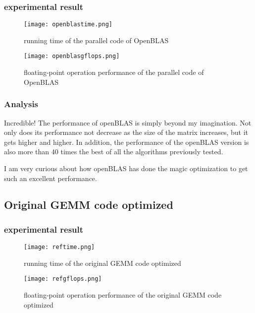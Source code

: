 \documentclass[11pt]{scrartcl} %
\begin{document}
	\subsubsection{experimental result}
		\begin{figure}[H]
			\centering
			\texttt{[image: openblastime.png]}
			\caption{running time of the parallel code of OpenBLAS}
			\label{}
		\end{figure}
		\begin{figure}[H]
			\centering
			\texttt{[image: openblasgflops.png]}
			\caption{floating-point operation performance of the parallel code of OpenBLAS}
			\label{}
		\end{figure}
		\subsubsection{Analysis}
		Incredible! The performance of openBLAS is simply beyond my imagination. Not only does its performance not decrease as the size of the matrix increases, but it gets higher and higher. In addition, the performance of the openBLAS version is also more than 40 times the best of all the algorithms previously tested.

I am very curious about how openBLAS has done the magic optimization to get such an excellent performance.
\subsection{Original GEMM code optimized}
	\subsubsection{experimental result}
		\begin{figure}[H]
			\centering
			\texttt{[image: reftime.png]}
			\caption{running time of the original GEMM code optimized}
			\label{}
		\end{figure}
		\begin{figure}[H]
			\centering
			\texttt{[image: refgflops.png]}
			\caption{floating-point operation performance of the original GEMM code optimized}
			\label{}
		\end{figure}
\end{document}
